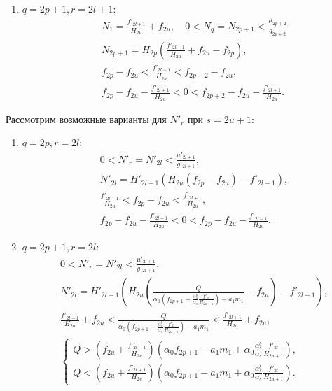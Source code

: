 \begin{enumerate}[leftmargin=10pt,itemindent=26pt]
    \item \(q=2p+1, r=2l+1\):
    \begin{align*}
        & N_1 = \frac{f'_{2l+1}}{H_{2u}} + f_{2u}, \quad 0 < N_q = N_{2p+1} < \frac{\mu_{2p+2}}{g_{2p+2}} \\
        & N_{2p+1} = H_{2p} \left( \frac{f'_{2l+1}}{H_{2u}} + f_{2u} - f_{2p} \right), \\
        & f_{2p} - f_{2u} < \frac{f'_{2l+1}}{H_{2u}} < f_{2p+2} - f_{2u}, \\
        & f_{2p} - f_{2u} - \frac{f'_{2l+1}}{H_{2u}} < 0 < f_{2p+2} - f_{2u} - \frac{f'_{2l+1}}{H_{2u}}.
    \end{align*}
\end{enumerate}

Рассмотрим возможные варианты для \(N'_r\) при \(s=2u+1\):
\begin{enumerate}[leftmargin=10pt,itemindent=26pt]
    \item \(q = 2p, r = 2l\):
    \begin{align*}
        & 0 < N'_r = N'_{2l} < \frac{\mu'_{2l+1}}{g'_{2l+1}}, \\
        & N'_{2l} = H'_{2l-1} \left( H_{2u} (f_{2p} - f_{2u}) - f'_{2l-1} \right), \\
        & \frac{f'_{2l-1}}{H_{2u}} < f_{2p} - f_{2u} < \frac{f'_{2l+1}}{H_{2u}}, \\
        & f_{2p} - f_{2u} - \frac{f'_{2l+1}}{H_{2u}} < 0 < f_{2p} - f_{2u} - \frac{f'_{2l-1}}{H_{2u}}.
    \end{align*}

    \item \(q = 2p+1, r = 2l\):
    \begin{align*}
        & 0 < N'_r = N'_{2l} < \frac{\mu'_{2l+1}}{g'_{2l+1}}, \\
        & N'_{2l} = H'_{2l-1} \left( H_{2u} \left( \frac{Q}{\alpha_0 \left( f_{2p+1} + \frac{\alpha^b_s}{\alpha_s} \frac{f'_{2l}}{H_{2u+1}} \right) - a_1 m_1} - f_{2u} \right) - f'_{2l-1} \right), \\
        & \frac{f'_{2l-1}}{H_{2u}} + f_{2u} < \frac{Q}{\alpha_0 \left( f_{2p+1} + \frac{\alpha^b_s}{\alpha_s} \frac{f'_{2l}}{H_{2u+1}} \right) - a_1 m_1} < \frac{f'_{2l+1}}{H_{2u}} + f_{2u}, \\
        & \begin{cases}
            Q > \left( f_{2u} + \frac{f'_{2l-1}}{H_{2u}} \right) \left( \alpha_0 f_{2p+1} - a_1 m_1 + \alpha_0 \frac{\alpha^b_s}{\alpha_s} \frac{f'_{2l}}{H_{2u+1}} \right), \\
            Q < \left( f_{2u} + \frac{f'_{2l+1}}{H_{2u}} \right) \left( \alpha_0 f_{2p+1} - a_1 m_1 + \alpha_0 \frac{\alpha^b_s}{\alpha_s} \frac{f'_{2l}}{H_{2u+1}} \right).
        \end{cases}
    \end{align*}


\end{enumerate}
